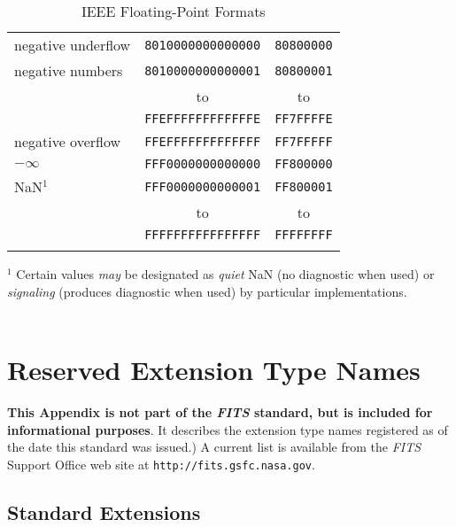 \documentclass[11pt,makeidx]{book}     %
\begin{document}
\begin{table}[htpb]
\begin{center}
\begin{tabular}{lcc}
    negative underflow  & {\tt 8010000000000000} & {\tt 80800000} \\
    negative numbers    & {\tt 8010000000000001} & {\tt 80800001} \\
                        &             to         &         to     \\
                        & {\tt FFEFFFFFFFFFFFFE} & {\tt FF7FFFFE} \\
    negative overflow   & {\tt FFEFFFFFFFFFFFFF} & {\tt FF7FFFFF} \\
    $-\infty$           & {\tt FFF0000000000000} & {\tt FF800000} \\
    NaN$^{1}$           & {\tt FFF0000000000001} & {\tt FF800001} \\
                        &             to         &         to     \\
                        & {\tt FFFFFFFFFFFFFFFF} & {\tt FFFFFFFF} \\
                        &                                         \\ \hline
\end{tabular}
\end{center}
$^1$ Certain values {\em may} be designated as  {\em quiet} NaN (no diagnostic
when used)  or {\em signaling} (produces diagnostic when used) by
particular implementations. \\ \\ 

\caption[IEEE Floating-Point Formats]{IEEE Floating-Point Formats}
\label{t:ieee}
\end{table}
 


\chapter{Reserved Extension Type Names}
\label{s:resname}   
{\bf This Appendix is not part of the {\em FITS\/} standard, 
but  is included for
informational purposes}.  It describes the
extension type names registered as of the date this standard was
issued.)  A current list is available from the 
{\em FITS\/} Support Office web site at 
{\tt http://fits.gsfc.nasa.gov}.

\section{Standard Extensions}
\end{document}
